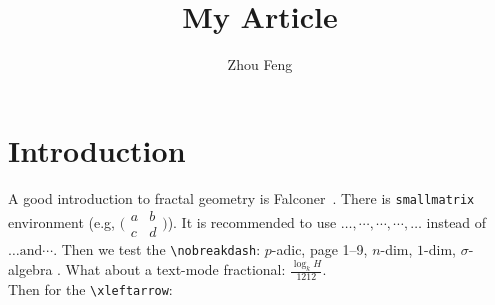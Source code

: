 \documentclass[12pt]{amsart}
\title[small title]{My Article}
\author{Zhou Feng}
\theoremstyle{plain}
\theoremstyle{definition}
\theoremstyle{remark}
\numberwithin{equation}{section} %
\newcommand{\Ndash}{\nobreakdash--}
\newcommand{\sigmaAlg}{$\sigma$\nobreakdash-algebra }
\newcommand{\ndiml}[1][n]{$#1$\nobreakdash-dim}
\newcommand{\padic}{$p$\nobreakdash-adic}
\begin{document}
%	 
\maketitle

%
%
%
%
%

\section{Introduction}\label{sec:intro}
A good introduction to fractal geometry is Falconer~\cite{Falconer2003}. There is \verb|smallmatrix| environment (e.g, $\big(\begin{smallmatrix}
			a & b\\ c&d
		\end{smallmatrix}\big)$). It is recommended to use $ \dotsc, \dotsb, \dotsm, \dotsi, \dotso $ instead of $ \ldots \text{and} \cdots$. Then we test the \verb|\nobreakdash|: \padic, page 1\Ndash9, \ndiml, \ndiml[1], \sigmaAlg.
What about a text-mode fractional: $ \tfrac{\log_{k} H}{1212} $.\\[20pt]
Then for the \verb|\xleftarrow|:
\end{document}

